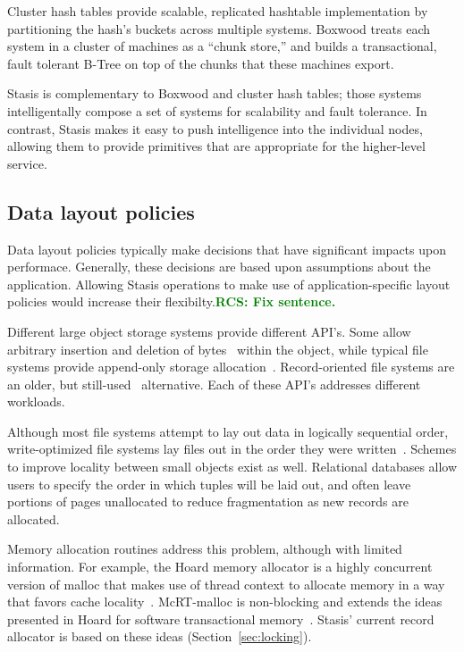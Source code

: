 \documentclass[letterpaper,twocolumn,10pt]{article}
\newcommand{\yad}{Stasis\xspace}
\newcommand{\yads}{Stasis'\xspace}
\newcommand{\rcs}[1]{\textcolor{green}{\bf RCS: #1}}
\begin{document}
Cluster hash tables provide scalable, replicated hashtable
implementation by partitioning the hash's buckets across multiple
systems.  Boxwood treats each system in a cluster of machines as a
``chunk store,'' and builds a transactional, fault tolerant B-Tree on
top of the chunks that these machines export.  

\yad is complementary to Boxwood and cluster hash tables; those
systems intelligentally compose a set of systems for scalability and
fault tolerance.  In contrast, \yad makes it easy to push intelligence
into the individual nodes, allowing them to provide primitives that
are appropriate for the higher-level service.  

\subsection{Data layout policies}

Data layout policies typically make decisions that have significant
impacts upon performace.  Generally, these decisions are based upon
assumptions about the application.  Allowing \yad operations to make
use of application-specific layout policies would increase their
flexibilty.\rcs{Fix sentence.}

Different large object storage systems provide different API's.
Some allow arbitrary insertion and deletion of bytes~\cite{esm}
within the object, while typical file systems
provide append-only storage allocation~\cite{ffs}.
Record-oriented file systems are an older, but still-used~\cite{gfs}
alternative. Each of these API's addresses 
different workloads.

Although most file systems attempt to lay out data in logically sequential
order, write-optimized file systems lay files out in the order they
were written~\cite{lfs}.  Schemes to improve locality between small
objects exist as well. Relational databases allow users to specify the order
in which tuples will be laid out, and often leave portions of pages
unallocated to reduce fragmentation as new records are allocated.

Memory allocation routines address this problem, although with limited
information.  For example, the Hoard memory allocator is a highly
concurrent version of malloc that makes use of thread context to
allocate memory in a way that favors cache locality~\cite{hoard}.
McRT-malloc is non-blocking and extends the ideas
presented in Hoard for software transactional memory~\cite{mcrt}.  
\yads current record allocator is based on these ideas (Section~\ref{sec:locking}).
\end{document}
